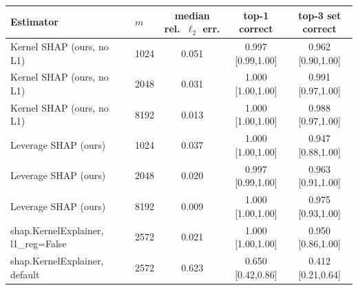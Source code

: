\begin{tabular}{llccc}
\toprule
Estimator & $m$ & median rel.\ $\ell_2$ err. & top-1 correct & top-3 set correct\\
\midrule
Kernel SHAP (ours, no L1) & 1024 & 0.051 & 0.997 [0.99,1.00] & 0.962 [0.90,1.00]\\
Kernel SHAP (ours, no L1) & 2048 & 0.031 & 1.000 [1.00,1.00] & 0.991 [0.97,1.00]\\
Kernel SHAP (ours, no L1) & 8192 & 0.013 & 1.000 [1.00,1.00] & 0.988 [0.97,1.00]\\
Leverage SHAP (ours) & 1024 & 0.037 & 1.000 [1.00,1.00] & 0.947 [0.88,1.00]\\
Leverage SHAP (ours) & 2048 & 0.020 & 0.997 [0.99,1.00] & 0.963 [0.91,1.00]\\
Leverage SHAP (ours) & 8192 & 0.009 & 1.000 [1.00,1.00] & 0.975 [0.93,1.00]\\
shap.KernelExplainer, l1\_reg=False & 2572 & 0.021 & 1.000 [1.00,1.00] & 0.950 [0.86,1.00]\\
shap.KernelExplainer, default & 2572 & 0.623 & 0.650 [0.42,0.86] & 0.412 [0.21,0.64]\\
\bottomrule
\end{tabular}